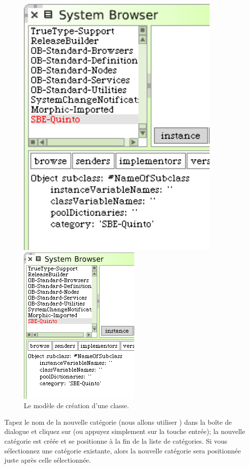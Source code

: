\documentclass[a4paper,10pt,twoside]{book}
\begin{document}
\begin{figure}[htb]
\begin{minipage}[b]{0.48\textwidth}
	{\centerline {\includegraphics[width=0.9\textwidth]{ClassTemplate}}}
	{\centerline {\includegraphics[scale=0.7]{ClassTemplate}}}
	\caption{Le modèle de création d'une classe.
	\label{fig:classTemplate}}
\end{minipage}
\end{figure}

Tapez le nom de la nouvelle catégorie (nous allons utiliser
) dans la boîte de dialogue et cliquez sur
 (ou appuyez simplement sur la touche entrée); la nouvelle catégorie est créée et se positionne à la fin de la liste de catégories.
Si vous sélectionnez une catégorie existante, alors la nouvelle catégorie sera positionnée juste après celle sélectionnée.
\end{document}
